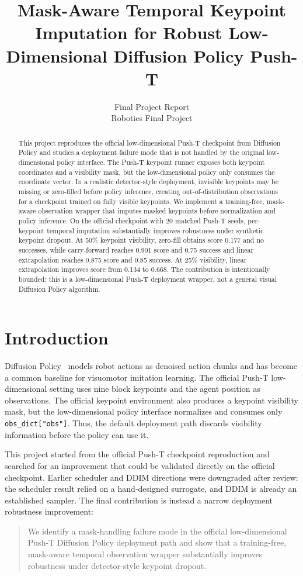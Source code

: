 \documentclass{article}
\title{Mask-Aware Temporal Keypoint Imputation for Robust Low-Dimensional Diffusion Policy Push-T}
\author{
  Final Project Report\\
  Robotics Final Project\\
}
\begin{document}
\maketitle

\begin{abstract}
This project reproduces the official low-dimensional Push-T checkpoint from Diffusion Policy and studies a deployment failure mode that is not handled by the original low-dimensional policy interface. The Push-T keypoint runner exposes both keypoint coordinates and a visibility mask, but the low-dimensional policy only consumes the coordinate vector. In a realistic detector-style deployment, invisible keypoints may be missing or zero-filled before policy inference, creating out-of-distribution observations for a checkpoint trained on fully visible keypoints. We implement a training-free, mask-aware observation wrapper that imputes masked keypoints before normalization and policy inference. On the official checkpoint with 20 matched Push-T seeds, per-keypoint temporal imputation substantially improves robustness under synthetic keypoint dropout. At 50\% keypoint visibility, zero-fill obtains score 0.177 and no successes, while carry-forward reaches 0.901 score and 0.75 success and linear extrapolation reaches 0.875 score and 0.85 success. At 25\% visibility, linear extrapolation improves score from 0.134 to 0.668. The contribution is intentionally bounded: this is a low-dimensional Push-T deployment wrapper, not a general visual Diffusion Policy algorithm.
\end{abstract}


\section{Introduction}

Diffusion Policy~\citep{chi2023diffusion} models robot actions as denoised action chunks and has become a common baseline for visuomotor imitation learning. The official Push-T low-dimensional setting uses nine block keypoints and the agent position as observations. The official keypoint environment also produces a keypoint visibility mask, but the low-dimensional policy interface normalizes and consumes only \texttt{obs\_dict["obs"]}. Thus, the default deployment path discards visibility information before the policy can use it.

This project started from the official Push-T checkpoint reproduction and searched for an improvement that could be validated directly on the official checkpoint. Earlier scheduler and DDIM directions were downgraded after review: the scheduler result relied on a hand-designed surrogate, and DDIM is already an established sampler. The final contribution is instead a narrow deployment robustness improvement:
\begin{quote}
We identify a mask-handling failure mode in the official low-dimensional Push-T Diffusion Policy deployment path and show that a training-free, mask-aware temporal observation wrapper substantially improves robustness under detector-style keypoint dropout.
\end{quote}
\end{document}
